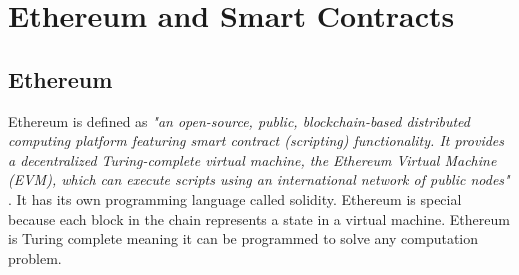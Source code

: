 \section{Ethereum and Smart Contracts}
\subsection{Ethereum}
Ethereum is defined as \textit{"an open-source, public, blockchain-based distributed computing platform featuring smart contract (scripting) functionality.  It provides a decentralized Turing-complete virtual machine, the Ethereum Virtual Machine (EVM), which can execute scripts using an international network of public nodes"} \cite{wiki:xxx}. It has its own programming language called solidity. Ethereum is special because each block in the chain represents a state in a virtual machine. Ethereum is Turing complete meaning it can be programmed to solve any computation problem.